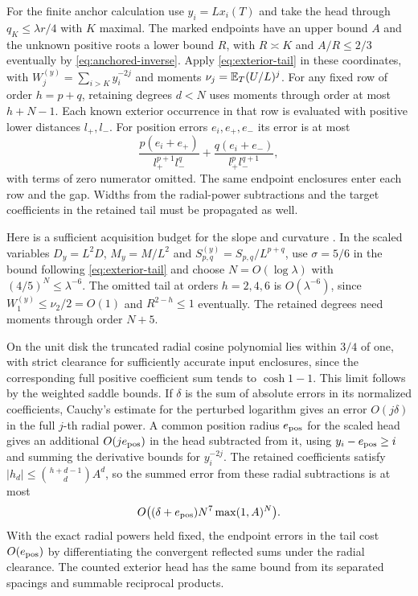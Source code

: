 For the finite anchor calculation use \(y_i=Lx_i(T)\) and take the head
through \(q_K\le\lambda r/4\) with \(K\) maximal. The marked endpoints have
an upper bound \(A\) and the unknown positive roots a lower bound \(R\),
with \(R\asymp K\) and \(A/R\le2/3\) eventually by \eqref{eq:anchored-inverse}.
Apply \eqref{eq:exterior-tail} in these coordinates, with
\(W_j^{(y)}=\sum_{i>K} y_i^{-2j}\) and moments \(\nu_j=\mathbb E_T(U/L)^j\).
For any fixed row of order \(h=p+q\), retaining degrees \(d<N\) uses
moments through order at most \(h+N-1\). Each known exterior occurrence
in that row is evaluated with positive lower distances \(l_+,l_-\).
For position errors \(e_i,e_+,e_-\) its error is at most
\[
 \frac{p(e_i+e_+)}{l_+^{p+1}l_-^q}
   +\frac{q(e_i+e_-)}{l_+^p l_-^{q+1}},
\]
with terms of zero numerator omitted. The same endpoint enclosures enter
each row and the gap. Widths from the radial-power subtractions and
the target coefficients in the retained tail must be propagated as well.

Here is a sufficient acquisition budget for the slope and curvature
\cite[finite-precision supplement]{EZCurvature}. In the scaled variables
\(D_y=L^2D\), \(M_y=M/L^2\) and \(S_{p,q}^{(y)}=S_{p,q}/L^{p+q}\), use
\(\sigma=5/6\) in the bound following \eqref{eq:exterior-tail} and choose
\(N=O(\log\lambda)\) with \((4/5)^N\le\lambda^{-6}\). The omitted tail
at orders \(h=2,4,6\) is \(O(\lambda^{-6})\), since
\(W_1^{(y)}\le\nu_2/2=O(1)\) and \(R^{2-h}\le1\) eventually. The retained
degrees need moments through order \(N+5\).

On the unit disk the truncated radial cosine polynomial lies within
\(3/4\) of one, with strict clearance for sufficiently accurate input
enclosures, since the corresponding full positive coefficient sum tends
to \(\cosh 1-1\). This limit follows by the weighted saddle bounds. If
\(\delta\) is the sum of absolute errors in its normalized coefficients,
Cauchy's estimate for the perturbed logarithm gives an error
\(O(j\delta)\) in the full \(j\)-th radial power. A common position radius
\(e_{\rm pos}\) for the scaled head gives an additional \(O(je_{\rm pos})\)
in the head subtracted from it, using \(y_i-e_{\rm pos}\ge i\) and summing
the derivative bounds for \(y_i^{-2j}\). The retained coefficients satisfy
\(|h_d|\le\binom{h+d-1}{d}A^d\), so the summed error from these radial
subtractions is at most
\begin{equation}\label{eq:anchored-input-width}
 O\big((\delta+e_{\rm pos})N^7\max(1,A)^N\big).
\end{equation}
With the exact radial powers held fixed, the endpoint errors in the tail
cost \(O(e_{\rm pos})\) by differentiating the convergent reflected sums
under the radial clearance. The counted exterior head has the same bound
from its separated spacings and summable reciprocal products.

